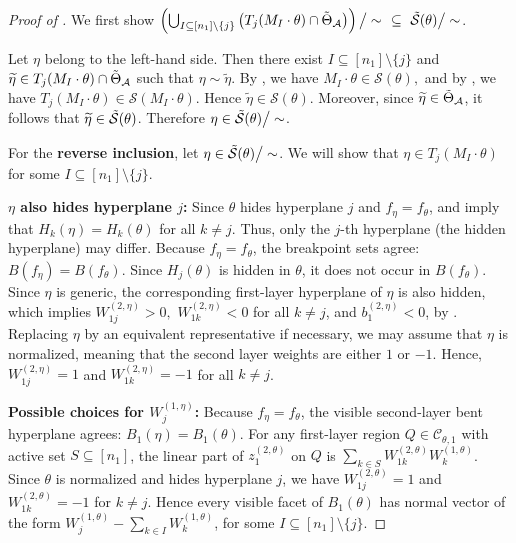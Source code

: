 \documentclass{article}
\theoremstyle{definition}
\newcommand{\architecture}{\mathcal{A}}
\newcommand{\gparamspace}[1]{\Tilde{\Theta}_{#1}}
\newcommand{\weights}[1]{W^{(#1)}}
\newcommand{\bias}[1]{b^{(#1)}}
\newcommand{\complex}{\mathcal{C}}
\newcommand{\preactivation}[1]{z^{(#1)}}
\newcommand{\breakpoints}[1]{B({#1})}
\newcommand{\fiber}[1]{\mathcal{S}({#1})}
\newcommand{\gfiber}[1]{\Tilde{\mathcal{S}}({#1})}
\newcommand{\modulo}[1]{\big/#1}
\begin{document}
\begin{proof}[Proof of ]
We first show
$
\left(
\bigcup_{I \subseteq [n_1]\setminus \{j\}}
\left(T_j(M_I \cdot \theta)\cap \gparamspace{\architecture}\right)
\right)\modulo{\sim} \ \
\subseteq \ 
\gfiber{\theta}\modulo{\sim}
$. 

Let $\eta$ belong to the left-hand side. Then there exist
$I \subseteq [n_1]\setminus\{j\}$ and
$
\widetilde\eta \in T_j(M_I\cdot \theta)\cap \gparamspace{\architecture}
$
such that $\eta\sim\widetilde\eta$. By , we have
$
M_I\cdot\theta \in \fiber{\theta},
$
and by , we have 
$
 T_j(M_I\cdot \theta)\in \fiber{M_I\cdot\theta}.
$
Hence $\widetilde\eta\in\fiber{\theta}$. 
Moreover, since $\widetilde\eta\in\gparamspace{\architecture}$, it follows that $\widetilde\eta\in\gfiber{\theta}$. 
Therefore $\eta\in\gfiber{\theta}\modulo{\sim}$. 


For the \textbf{reverse inclusion}, let $\eta\in\gfiber{\theta}\modulo{\sim}$. 
 We will show that 
$
\eta \in T_j(M_I\cdot\theta)
$
for some $I\subseteq[n_1]\setminus\{j\}$.

\medskip
\textbf{$\eta$ also hides hyperplane $j$:}
Since $\theta$ hides hyperplane $j$ and $f_\eta=f_\theta$,  and  imply that
$
H_k(\eta)=H_k(\theta)
$
for all $k\neq j$. Thus, only the $j$-th hyperplane (the hidden hyperplane) may differ. 
%
Because $f_\eta=f_\theta$, the breakpoint sets agree:
$
\breakpoints{f_\eta}=\breakpoints{f_\theta}
$. 
Since $H_j(\theta)$ is hidden in $\theta$, it does not occur in $\breakpoints{f_\theta}$. 
Since $\eta$ is generic, the corresponding first-layer hyperplane of $\eta$ is also hidden, which implies 
$
\weights{2,\eta}_{1j}>0,
$
$
\weights{2,\eta}_{1k}<0
$
for all $k\neq j$,
and
$
\bias{2,\eta}_1<0$, by . Replacing $\eta$ by an equivalent representative if necessary, we may assume that $\eta$ is normalized, meaning that the second layer weights are either $1$ or $-1$. 
Hence, 
$
\weights{2,\eta}_{1j}=1
$
and
$
\weights{2,\eta}_{1k}=-1
$
for all $k\neq j$. 

\medskip
\textbf{Possible choices for $\weights{1,\eta}_j$:}
Because $f_\eta=f_\theta$, the visible second-layer bent hyperplane agrees:
$
B_1(\eta)=B_1(\theta)
$. 
For any first-layer region $Q\in\complex_{\theta,1}$ with active set $S\subseteq[n_1]$, the linear part of $\preactivation{2,\theta}_1$ on $Q$ is
$
\sum_{k\in S}\weights{2,\theta}_{1k}\weights{1,\theta}_k
$. 
Since $\theta$ is normalized and hides hyperplane $j$, we have
$
\weights{2,\theta}_{1j}=1
$
and
$
\weights{2,\theta}_{1k}=-1
$
for $k\neq j$.
Hence every visible facet of $B_1(\theta)$ has normal vector of the form
$
\weights{1,\theta}_j-\sum_{k\in I}\weights{1,\theta}_k
$, for some $I\subseteq[n_1]\setminus\{j\}$. 


\end{proof}
\end{document}
